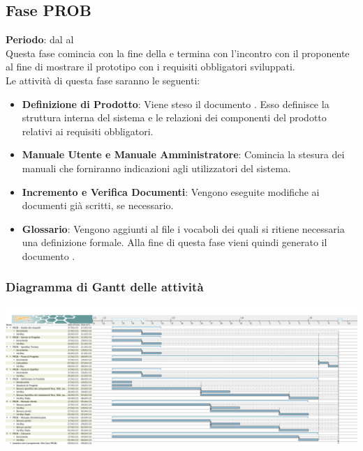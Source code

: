 \subsection{Fase PROB}
	\textbf{Periodo}: dal  al  \\Questa fase comincia con la fine della  e termina con l'incontro con il proponente al fine di mostrare il prototipo con i requisiti obbligatori sviluppati.\\Le attività di questa fase saranno le seguenti:
	\begin{itemize}
		\item\textbf{Definizione di Prodotto}: Viene steso il documento . Esso definisce la struttura interna del sistema e le relazioni dei componenti del prodotto relativi ai requisiti obbligatori.
		\item\textbf{Manuale Utente e Manuale Amministratore}: Comincia la stesura dei manuali che forniranno indicazioni agli utilizzatori del sistema.
		\item\textbf{Incremento e Verifica Documenti}: Vengono eseguite modifiche ai documenti già scritti, se necessario.
		\item\textbf{Glossario}: Vengono aggiunti al file  i vocaboli dei quali si ritiene necessaria una definizione formale. Alla fine di questa fase vieni quindi generato il documento .
	\end{itemize}
	\subsubsection{Diagramma di Gantt delle attività}
		\includegraphics[scale=0.25]{PianoDiProgetto/Pics/FasePROB.png}